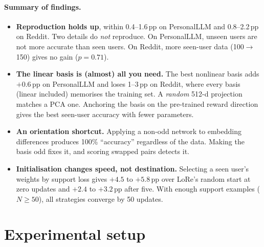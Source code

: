 \documentclass[11pt,a4paper]{article}
\newcommand{\pp}{\,pp\xspace}
\begin{document}
\paragraph{Summary of findings.}
\begin{itemize}
\item \textbf{Reproduction holds up}, within 0.4--1.6\pp on PersonalLLM and 0.8--2.2\pp on Reddit. Two
details do \emph{not} reproduce. On PersonalLLM, unseen users are not more accurate than seen users. On
Reddit, more seen-user data (100$\to$150) gives no gain ($p=0.71$).
\item \textbf{The linear basis is (almost) all you need.} The best nonlinear basis adds $+0.6$\pp on PersonalLLM
and loses 1--3\pp on Reddit, where every basis (linear included) memorises the training set. A
\emph{random} 512-d projection matches a PCA one. Anchoring the basis on the pre-trained reward
direction gives the best seen-user accuracy with fewer parameters.
\item \textbf{An orientation shortcut.} Applying a non-odd network to embedding differences produces
100\% ``accuracy'' regardless of the data. Making the basis odd fixes it, and scoring swapped pairs
detects it.
\item \textbf{Initialisation changes speed, not destination.} Selecting a seen user's weights by support
loss gives $+4.5$ to $+5.8$\pp over LoRe's random start at zero updates and $+2.4$ to $+3.2$\pp after
five. With enough support examples ($N\ge50$), all strategies converge by 50 updates.
\end{itemize}

\section{Experimental setup}
\label{sec:setup}
\end{document}
